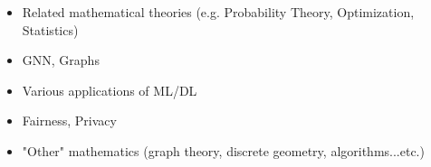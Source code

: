 \documentclass[10pt,a4]{article}
\begin{document}
\begin{small}
\begin{itemize}{}{}
\item Related mathematical theories (e.g. Probability Theory, Optimization, Statistics)

\item GNN, Graphs

\item Various applications of ML/DL

\item Fairness, Privacy

\item "Other" mathematics (graph theory, discrete geometry, algorithms...etc.)
\end{itemize}
%
%
%

\end{small}
\end{document}
